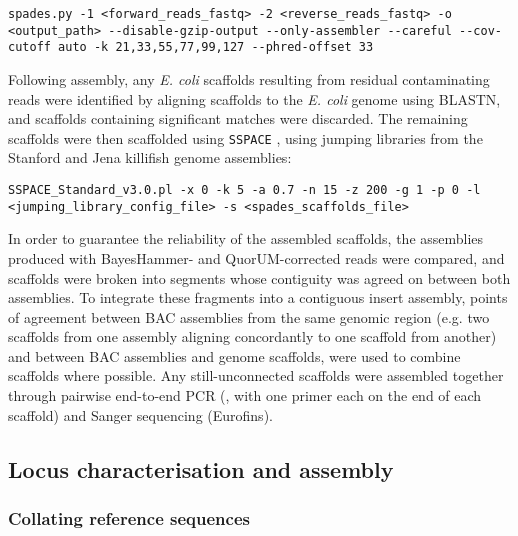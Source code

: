 \begin{lstlisting}
spades.py -1 <forward_reads_fastq> -2 <reverse_reads_fastq> -o <output_path> --disable-gzip-output --only-assembler --careful --cov-cutoff auto -k 21,33,55,77,99,127 --phred-offset 33
\end{lstlisting}

Following assembly, any \textit{E. coli} scaffolds resulting from residual contaminating reads were identified by aligning scaffolds to the \textit{E. coli} genome using BLASTN, and scaffolds containing significant matches were discarded. The remaining scaffolds were then scaffolded using \lstinline{SSPACE} \parencite{boetzer2011sspace}, using jumping libraries from the Stanford and Jena killifish genome assemblies: %

\begin{lstlisting}
SSPACE_Standard_v3.0.pl -x 0 -k 5 -a 0.7 -n 15 -z 200 -g 1 -p 0 -l <jumping_library_config_file> -s <spades_scaffolds_file>
\end{lstlisting}

In order to guarantee the reliability of the assembled scaffolds, the assemblies produced with BayesHammer- and QuorUM-corrected reads were compared, and scaffolds were broken into segments whose contiguity was agreed on between both assemblies. To integrate these fragments into a contiguous insert assembly, points of agreement between BAC assemblies from the same genomic region (e.g. two scaffolds from one assembly aligning concordantly to one scaffold from another) and between BAC assemblies and genome scaffolds, were used to combine scaffolds where possible. Any still-unconnected scaffolds were assembled together through pairwise end-to-end PCR (, with one primer each on the end of each scaffold) and Sanger sequencing (Eurofins). %

\subsection{Locus characterisation and assembly}
\label{sec:methods_comp_locus}

\subsubsection{Collating reference sequences}
\label{sec:methods_comp_locus_reference}

